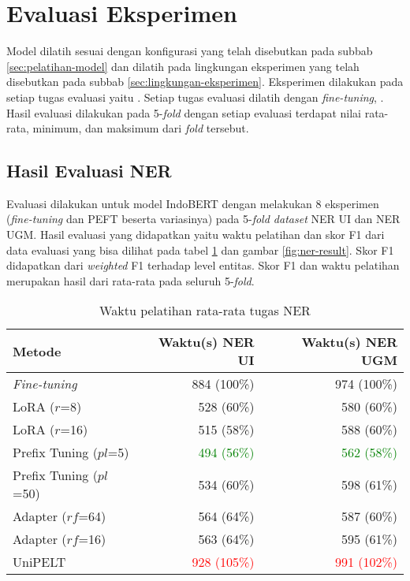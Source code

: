 \section{Evaluasi Eksperimen}

Model dilatih sesuai dengan konfigurasi yang telah disebutkan pada subbab \ref{sec:pelatihan-model} dan dilatih pada lingkungan eksperimen yang telah disebutkan pada subbab \ref{sec:lingkungan-eksperimen}. Eksperimen dilakukan pada setiap tugas evaluasi yaitu \nlptask. Setiap tugas evaluasi dilatih dengan \textit{fine-tuning}, \methodPEFT. Hasil evaluasi dilakukan pada 5-\textit{fold} dengan setiap evaluasi terdapat nilai rata-rata, minimum, dan maksimum dari \textit{fold} tersebut.

\subsection{Hasil Evaluasi NER}
\label{sec:ner-evaluation}

Evaluasi dilakukan untuk model IndoBERT dengan melakukan 8 eksperimen (\textit{fine-tuning} dan PEFT beserta variasinya) pada 5-\textit{fold dataset} NER UI dan NER UGM. Hasil evaluasi yang didapatkan yaitu waktu pelatihan dan skor F1 dari data evaluasi yang bisa dilihat pada tabel \ref{table:runtime-ner} dan gambar \ref{fig:ner-result}. Skor F1 didapatkan dari \textit{weighted} F1 terhadap level entitas. Skor F1 dan waktu pelatihan merupakan hasil dari rata-rata pada seluruh 5-\textit{fold}.

\begin{table}[h]
    \centering
    \caption{Waktu pelatihan rata-rata tugas NER}
    \label{table:runtime-ner}
    \begin{tabular}{l|r|r}
        \toprule
        \textbf{Metode} & \textbf{Waktu(s) NER UI} & \textbf{Waktu(s) NER UGM} \\
        \midrule
        \textit{Fine-tuning} & 884 (100\%) & 974 (100\%) \\
        LoRA ($r$=8) & 528 (60\%) & 580 (60\%) \\
        LoRA ($r$=16) & 515 (58\%) & 588 (60\%) \\
        Prefix Tuning ($pl$=5) & \textcolor{Green}{494 (56\%)} & \textcolor{Green}{562 (58\%)} \\
        Prefix Tuning ($pl$=50) & 534 (60\%) & 598 (61\%) \\
        Adapter ($rf$=64) & 564 (64\%) & 587 (60\%) \\
        Adapter ($rf$=16) & 563 (64\%) & 595 (61\%) \\
        UniPELT & \textcolor{Red}{928 (105\%)} & \textcolor{Red}{991 (102\%)} \\
        \bottomrule
    \end{tabular}
\end{table}

